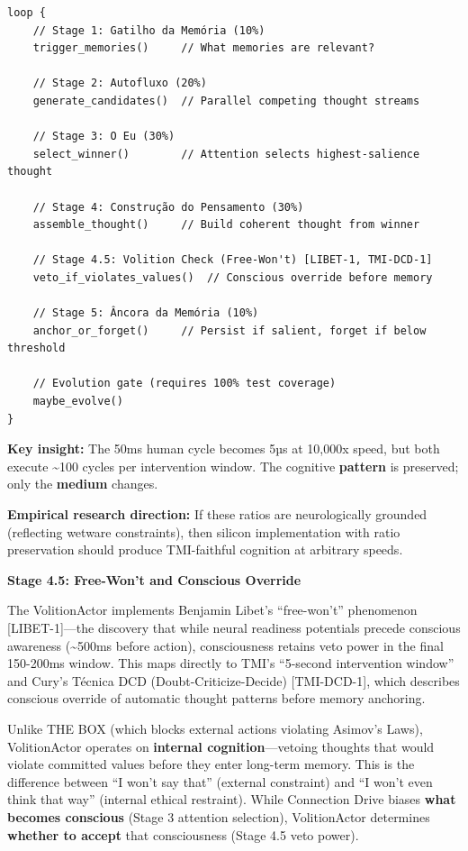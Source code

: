 \documentclass[
]{article}
\begin{document}
\begin{verbatim}
loop {
    // Stage 1: Gatilho da Memória (10%)
    trigger_memories()     // What memories are relevant?

    // Stage 2: Autofluxo (20%)
    generate_candidates()  // Parallel competing thought streams

    // Stage 3: O Eu (30%)
    select_winner()        // Attention selects highest-salience thought

    // Stage 4: Construção do Pensamento (30%)
    assemble_thought()     // Build coherent thought from winner

    // Stage 4.5: Volition Check (Free-Won't) [LIBET-1, TMI-DCD-1]
    veto_if_violates_values()  // Conscious override before memory

    // Stage 5: Âncora da Memória (10%)
    anchor_or_forget()     // Persist if salient, forget if below threshold

    // Evolution gate (requires 100% test coverage)
    maybe_evolve()
}
\end{verbatim}

\textbf{Key insight:} The 50ms human cycle becomes 5µs at 10,000x speed,
but both execute \textasciitilde100 cycles per intervention window. The
cognitive \textbf{pattern} is preserved; only the \textbf{medium}
changes.

\textbf{Empirical research direction:} If these ratios are
neurologically grounded (reflecting wetware constraints), then silicon
implementation with ratio preservation should produce TMI-faithful
cognition at arbitrary speeds.

\textbf{Stage 4.5: Free-Won't and Conscious Override}

The VolitionActor implements Benjamin Libet's ``free-won't'' phenomenon
{[}LIBET-1{]}---the discovery that while neural readiness potentials
precede conscious awareness (\textasciitilde500ms before action),
consciousness retains veto power in the final 150-200ms window. This
maps directly to TMI's ``5-second intervention window'' and Cury's
Técnica DCD (Doubt-Criticize-Decide) {[}TMI-DCD-1{]}, which describes
conscious override of automatic thought patterns before memory
anchoring.

Unlike THE BOX (which blocks external actions violating Asimov's Laws),
VolitionActor operates on \textbf{internal cognition}---vetoing thoughts
that would violate committed values before they enter long-term memory.
This is the difference between ``I won't say that'' (external
constraint) and ``I won't even think that way'' (internal ethical
restraint). While Connection Drive biases \textbf{what becomes
conscious} (Stage 3 attention selection), VolitionActor determines
\textbf{whether to accept} that consciousness (Stage 4.5 veto power).
\end{document}
